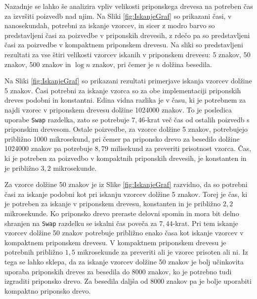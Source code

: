 Nazadnje se lahko še analizira vpliv velikosti priponskega drevesa na potreben čas za izvršiti poizvedb nad njim. Na Sliki \ref{fig:IskanjeGraf} so prikazani časi, v nanosekundah, potrebni za iskanje vzorcev, in sicer z modro barvo so predstavljeni časi za poizvedbe v priponskih drevesih, z rdečo pa so predstavljeni časi za poizvedbe v kompaktnem priponskem drevesu. Na sliki so predstavljeni rezultati za vse štiri velikosti vzorcev iskanih v priponskem drevesu: 5 znakov, 50 znakov, 500 znakov in $\log{n}$ znakov, pri čemer je $n$ dolžina besedila.

Na Sliki \ref{fig:IskanjeGraf} so prikazani rezultati primerjave iskanja vzorcev dolžine 5 znakov. Časi potrebni za iskanje vzorca so za obe implementaciji priponskih dreves podobni in konstantni. Edina vidna razlika je v času, ki je potrebnem za najdi vzorec v priponskem drevesu dolžine 1024000 znakov. To je posledica uporabe \verb|Swap| razdelka, zato se potrebuje $7,46$-krat več čas od ostalih poizvedb s priponskim drevesom. Ostale poizvedbe, za vzorce dolžine 5 znakov, potrebujejo približno 1000 mikrosekund, pri čemer pa priponsko drevo za besedilo dolžine 1024000 znakov pa potrebuje $8,79$ milisekund za preveriti prisotnost vzorca. Čas, ki je potreben za poizvedbo v kompaktnih priponskih drevesih, je konstanten in je približno $3,2$ mikrosekunde.

Za vzorce dolžine 50 znakov je iz Slike \ref{fig:IskanjeGraf} razvidno, da so potrebni časi za iskanje podobni kot pri iskanju vzorcev dolžine 5 znakov. Torej je čas, ki je potreben za iskanje v priponskem drevesu, konstanten in je  približno $2,2$ mikrosekunde. Ko priponsko drevo preraste delovni spomin in mora bit delno shranjen na \verb|Swap| razdelku se iskalni čas poveča za  $7,44$-krat. Pri tem iskanje vzorcev dolžine 50 znakov potrebuje približno enako časa kot iskanje vzorcev v kompaktnem priponskem drevesu. V kompaktnem priponskem drevesu je potrebnih približno $1,5$ mikrosekunde za preveriti ali je vzorec prisoten ali ni. Iz tega se lahko sklepa, da za iskanje vzorcev dolžine 50 znakov je bolj učinkovita uporaba priponskih dreves za besedila do 8000 znakov, ko je potrebno tudi izgraditi priponsko drevo. Za besedila daljša od 8000 znakov pa je bolje uporabiti kompaktno priponsko drevo.

